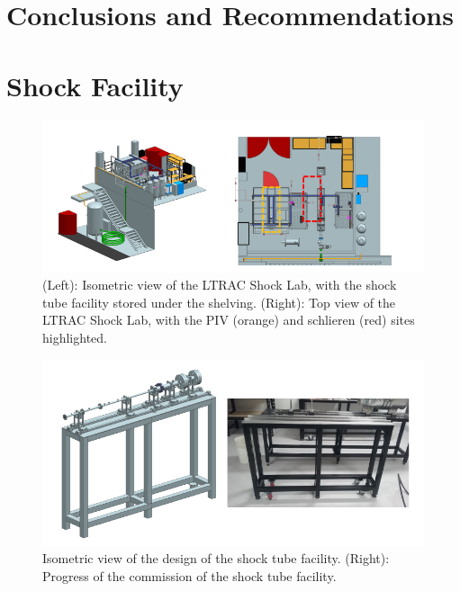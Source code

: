 \newpage
\section{Conclusions and Recommendations}

\newpage



\normalsize
\newpage

\appendix
{}

\section{Shock Facility} \label{app:facility}

\begin{figure}[H] 
	\centering
	\includegraphics[width=1\textwidth]{fig10.PNG} 
	\caption{(Left): Isometric view of the LTRAC Shock Lab, with the shock tube facility stored under the
		shelving. (Right): Top view of the LTRAC Shock Lab, with the PIV (orange) and schlieren (red) sites
		highlighted.}
	\label{fig:10}
\end{figure}

\begin{figure}[H] 
	\centering
	\includegraphics[width=1\textwidth]{fig8.PNG} 
	\caption{Isometric view of the design of the shock tube facility. (Right): Progress of the commission
		of the shock tube facility.}
	\label{fig:8}
\end{figure}

